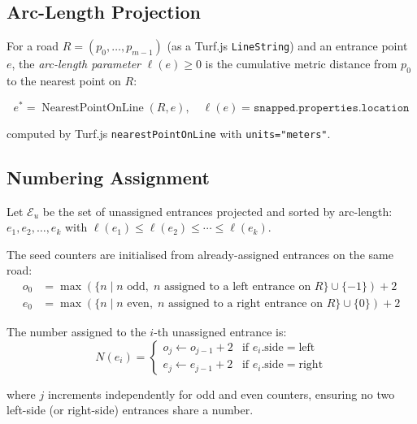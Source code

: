 \documentclass[12pt,a4paper]{article}
\theoremstyle{definition}
\theoremstyle{plain}
\theoremstyle{remark}
\begin{document}
\subsection{Arc-Length Projection}

For a road $R = (p_0, \ldots, p_{m-1})$ (as a Turf.js \texttt{LineString})
and an entrance point $e$, the \emph{arc-length parameter}
$\ell(e) \geq 0$ is the cumulative metric distance from $p_0$ to the
nearest point on $R$:

\begin{equation}
  e^* = \operatorname{NearestPointOnLine}(R, e), \quad
  \ell(e) = \texttt{snapped.properties.location}
  \label{eq:arc_length}
\end{equation}

computed by Turf.js \texttt{nearestPointOnLine} with \texttt{units="meters"}.

\subsection{Numbering Assignment}

Let $\mathcal{E}_u$ be the set of unassigned entrances projected and sorted
by arc-length: $e_1, e_2, \ldots, e_k$ with
$\ell(e_1) \leq \ell(e_2) \leq \cdots \leq \ell(e_k)$.

The seed counters are initialised from already-assigned entrances on the
same road:
\begin{align}
  o_0 &= \max\!\left(\{n \mid n \text{ odd},\;
    n \text{ assigned to a left entrance on } R\} \cup \{-1\}\right) + 2
  \label{eq:odd_seed} \\
  e_0 &= \max\!\left(\{n \mid n \text{ even},\;
    n \text{ assigned to a right entrance on } R\} \cup \{0\}\right) + 2
  \label{eq:even_seed}
\end{align}

The number assigned to the $i$-th unassigned entrance is:
\begin{equation}
  N(e_i) =
  \begin{cases}
    o_j \leftarrow o_{j-1} + 2 & \text{if } e_i.\mathrm{side} = \mathrm{left}  \\
    e_j \leftarrow e_{j-1} + 2 & \text{if } e_i.\mathrm{side} = \mathrm{right}
  \end{cases}
  \label{eq:entrance_number}
\end{equation}

where $j$ increments independently for odd and even counters, ensuring
no two left-side (or right-side) entrances share a number.
\end{document}
